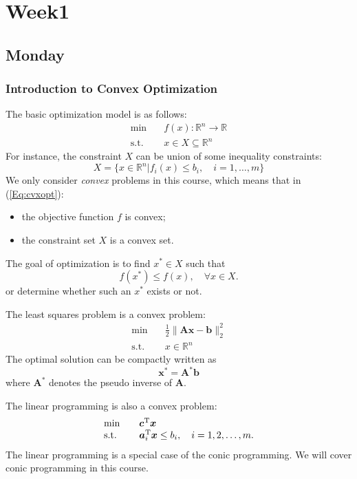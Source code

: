 
\chapter{Week1}

\section{Monday}

\subsection{Introduction to Convex Optimization}
The basic optimization model is as follows:
\begin{equation}\label{Eq:cvxopt}
\begin{array}{ll}
\min&\quad f(x):\mathbb{R}^n\to\mathbb{R}\\
\mbox{s.t.}&\quad x\in X\subseteq \mathbb{R}^n
\end{array}
\end{equation}
For instance, the constraint $X$ can be union of some inequality constraints:
\[
X=\bigg\{
x\in\mathbb{R}^n
\bigg|
f_i(x)\le b_i,\quad i=1,\dots,m
\bigg\}
\]
We only consider \emph{convex} problems in this course,
which means that in (\ref{Eq:cvxopt}):
\begin{itemize}
\item
the objective function $f$ is convex;
\item
the constraint set $X$ is a convex set.
\end{itemize}
The goal of optimization is to find $x^*\in X$ such that 
\[
f(x^*)\le f(x),\quad \forall x\in X.
\]
or determine whether such an $x^*$ exists or not.

\begin{example}
The least squares problem is a convex problem:
\[
\begin{array}{ll}
\min&\quad\frac{1}{2}\|\bm{Ax}-\bm b\|_2^2\\
\mbox{s.t.}&\quad x\in\mathbb{R}^n
\end{array}
\]
The optimal solution can be compactly written as
\[
\bm x^* = \bm A^{\mbox{*}}\bm b
\]
where $\bm A^{\mbox{*}}$ denotes the pseudo inverse of $\bm A$.
\end{example}
\begin{example}
The linear programming is also a convex problem:
 \[
\begin{array}{ll}
\min&\quad\bm c^{\mathrm T}\bm x\\
\mbox{s.t.}&\quad \bm a_i^{\mathrm T}\bm x\le b_i,\quad i=1,2,\dots,m.
\end{array}
\]
The linear programming is a special case of the conic programming.
We will cover conic programming in this course.
\end{example}


